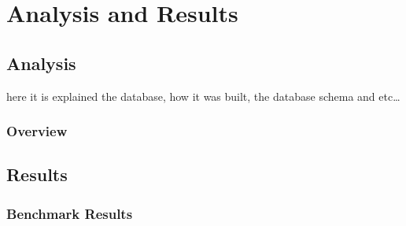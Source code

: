 

\chapter{Analysis and Results} \label{chap4:analysis_results}
\section{Analysis} \label{sec4:analysis}
here it is explained the database, how it was built, the database schema and etc\ldots

\subsection{Overview} \label{sec4:analysis_overview}





\section{Results} \label{sec4:results}
\subsection{Benchmark Results} \label{sec4:benchmark_results}

